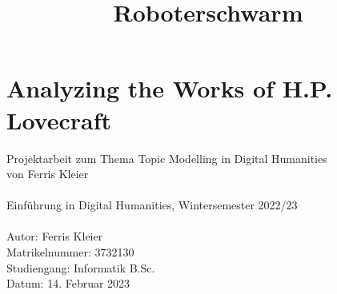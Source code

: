 \documentclass[11pt]{article}
\title{Roboterschwarm}
\begin{document}
     \section*{Analyzing the Works of H.P. Lovecraft}
    Projektarbeit zum Thema Topic Modelling in Digital Humanities
    \\von Ferris Kleier\\\\
    Einführung in Digital Humanities, Wintersemester 2022/23\\\\
    Autor: Ferris Kleier\\
    Matrikelnummer: 3732130\\
    Studiengang: Informatik B.Sc.\\
    Datum: 14. Februar 2023

    
    
    
    
    
    
    
    
    
\end{document}

